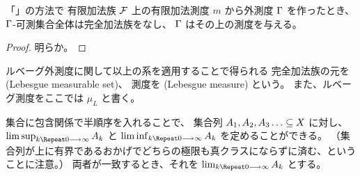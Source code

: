\documentclass[dvipdfmx, uplatex]{jsreport}
\begin{document}
\begin{cor}
「」の方法で
有限加法族 \(\mathcal{F}\) 上の有限加法測度 \(m\) から外測度 \(\Gamma\) を作ったとき、
\(\Gamma\)-可測集合全体は完全加法族をなし、
\(\Gamma\) はその上の測度を与える。
\end{cor}
\begin{proof}
明らか。
\end{proof}

\begin{defi}
ルベーグ外測度に関して以上の系を適用することで得られる
完全加法族の元を (Lebesgue measurable set)、
測度を (Lebesgue measure) という。
また、ルベーグ測度をここでは \(\mu_L\) と書く。
\end{defi}

\begin{defi}
集合に包含関係で半順序を入れることで、
集合列 \(A_1, A_2, A_3 \dots \sub X\) に対し、
 \(\limsup_{k \to \ify} A_k\) と \(\liminf_{k \to \ify} A_k\) を定めることができる。
（集合列が上に有界であるおかげでどちらの極限も真クラスにならずに済む、ということに注意。）
両者が一致するとき、それを \(\lim_{k \to \ify} A_k\) とする。
\end{defi}
\end{document}

